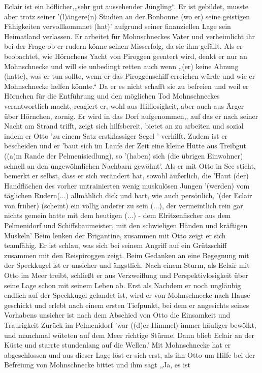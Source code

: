 Eclair ist ein höflicher,\cite[S.16]{pir}\cite[S.42ff]{pir}„sehr gut aussehender Jüngling“.\cite[S.15]{pir} Er ist gebildet, \cite[S.15]{pir} musste aber trotz seiner '(l)ängere(n) Studien an der Bonbonne (wo er) seine geistigen Fähigkeiten vervollkommnet (hat)'\cite[S.15]{pir} aufgrund seiner finanziellen Lage sein Heimatland verlassen.\cite[S.15f]{pir} Er arbeitet für Mohnschneckes Vater und verheimlicht ihr bei der Frage ob er rudern könne \cite[S.17]{pir} seinen Misserfolg, da sie ihm gefällt.\cite[S.17]{pir} Als er beobachtet, wie Hörnchens Yacht von Piroggen geentert wird, denkt er nur an Mohnschnecke und will sie unbedingt retten\cite[S.29]{pir} auch wenn „(er) keine Ahnung (hatte), was er tun sollte, wenn er das Piroggenschiff erreichen würde und wie er Mohnschnecke helfen könnte.“ Da er es nicht schafft sie zu befreien und weil er Hörnchen für die Entführung und den möglichen Tod Mohnschneckes verantwortlich macht, reagiert er, wohl aus Hilflosigkeit, aber auch aus Ärger über Hörnchen, zornig.\cite[S.36]{pir} Er wird in das Dorf aufgenommen,\cite[S.67]{pir}, auf das er nach seiner Nacht am Strand trifft, \cite[S.43]{pir} zeigt sich hilfsbereit,\cite[S.44]{pir} bietet an zu arbeiten\cite[S.44]{pir} und sozial indem er Otto 'zu einem Satz erstklassiger Segel '\cite[S.106ff]{pir} verhilft. Zudem ist er bescheiden und er 'baut sich im Laufe der Zeit eine kleine Hütte aus Treibgut ((a)m Rande der Pelmenisiedlung),\cite[S.67]{pir} so '(haben) sich (die übrigen Einwohner) schnell an den ungewöhnlichen Nachbarn gewöhnt'.\cite[S.67]{pir} Als er mit Otto in See sticht, bemerkt er selbst, dass er sich verändert hat, sowohl äußerlich, die 'Haut (der) Handflächen\cite[S.66]{pir} des vorher untrainierten wenig muskulösen Jungen \cite[S.15]{pir} '(werden) vom täglichen Rudern(...) allmählich dick und hart,\cite[S.66]{pir} wie auch persönlich, '(der Eclair von früher) (scheint) ein völlig anderer zu sein (...), der vermeintlich rein gar nichts gemein hatte mit dem heutigen (...) - dem Elritzenfischer aus dem Pelmenidorf und Schiffsbaumeister, mit den schwieligen Händen und kräftigen Muskeln'\cite[S.137]{pir} Beim lenken der Brigantine, zusammen mit Otto zeigt er sich teamfähig. \cite[S.134]{pir} Er ist schlau, was sich bei seinem Angriff auf ein Grützschiff zusammen mit den Reispiroggen zeigt. \cite[S.309ff]{pir} Beim Gedanken an eine Begegnung mit der Speckkugel ist er  unsicher und ängstlich.\cite[S.162]{pir} Nach einem Sturm, als Eclair mit Otto im Meer treibt, schließt er aus Verzweiflung und Perspektivlosigkeit über seine Lage schon mit seinem Leben ab. \cite[S.209]{pir} Erst als Nachdem er noch ungläubig endlich auf der Speckkugel gelandet ist,\cite[S.460]{pir} wird er von Mohnschnecke nach Hause geschickt \cite[S.464]{pir} und erlebt  nach einem ersten Tiefpunkt, bei dem er angesichts seines Vorhabens unsicher ist \cite[S.414]{pir} nach dem Abschied von Otto die Einsamkeit und Traurigkeit \cite[S.515f]{pir} Zurück im Pelmenidorf 'war ((d)er Himmel) immer häufiger bewölkt, und manchmal wüteten auf dem Meer richtige Stürme. Dann blieb Eclair an der Küste und starrte stundenlang auf die Wellen.'\cite[S.515f]{pir} Mit Mohnschnecke hat er abgeschlossen und aus dieser Lage löst er sich erst, als ihn Otto um Hilfe bei der Befreiung von Mohnschnecke bittet und ihm sagt „Ja, es ist 